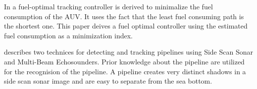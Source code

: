 	In \cite{fuel_optimal_control} a fuel-optimal tracking controller is derived to minimalize the fuel consumption 
	of the AUV. It uses the fact that the least fuel consuming path is the shortest one. This
	paper deives a fuel optimal controller using the estimated fuel consumption as a minimization index. 

	\cite{side_scan_sonar} describes two technices for detecting and tracking pipelines using Side Scan
	Sonar and Multi-Beam Echosounders. Prior knowledge about the pipeline are utilized for the recognision
	of the pipeline. A pipeline creates very distinct shadows in a side scan sonar image and are easy to
	separate from the sea bottom.


